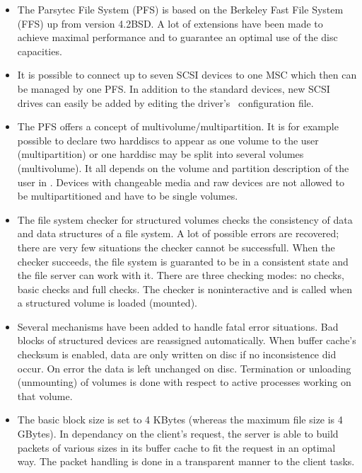 \begin{itemize}

  \item The Parsytec File System (PFS) is based on the Berkeley Fast File 
        System (FFS) up from version 4.2BSD. A lot of extensions have been 
        made to achieve maximal performance and to guarantee an optimal use of 
        the disc capacities.

  \item It is possible to connect up to seven SCSI devices to one MSC which
        then can be managed by one PFS. In addition to the standard devices, 
        new SCSI drives can easily be added by editing the driver's 
        \SIS\ configuration file.

  \item The PFS offers a concept of multivolume\slash multipartition. It is
        for example possible to declare two harddiscs to appear as one volume
        to the user (multipartition) or one harddisc may
        be split into several volumes (multivolume). It all
        depends on the volume and partition description of the user in \DIS.
        Devices with changeable media and raw devices are not allowed to be
        multipartitioned and have to be single volumes.

  \item The file system checker for structured volumes checks the consistency 
        of data and data structures of a file system. A lot of possible errors 
        are recovered; there are very few situations the checker cannot be 
        successfull. When the checker succeeds, the file system is guaranted to 
        be in a consistent state and the file server can work with it. There 
        are three checking modes: no checks, basic checks and full checks. The 
        checker is noninteractive and is called when a structured volume is 
        loaded (mounted).

  \item Several mechanisms have been added to handle fatal error situations. 
        Bad blocks of structured devices are reassigned automatically. When 
        buffer cache's checksum is enabled, data are only written on disc if 
        no inconsistence did occur. On error the data is left unchanged on 
        disc. Termination or unloading (unmounting) of volumes is done with 
        respect to active processes working on that volume.

  \item The basic block size is set to 4 KBytes (whereas the maximum file
        size is 4 GBytes). In dependancy on the
        client's request, the server is able to build packets of various sizes
        in its buffer cache to fit the request in an optimal way. The packet
        handling is done in a transparent manner to the client tasks.


\end{itemize}
